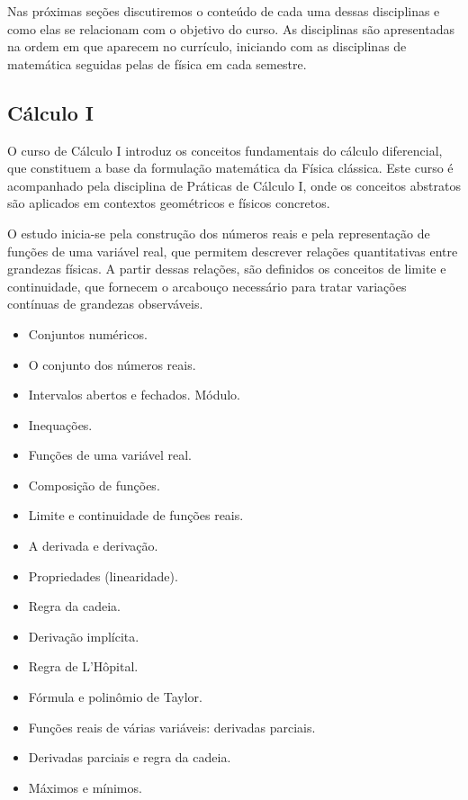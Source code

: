 \documentclass[a4paper, 12pt]{article}
\newcounter{mat}
\begin{document}
Nas próximas seções discutiremos o conteúdo de cada uma dessas disciplinas e como elas
se relacionam com o objetivo do curso. As disciplinas são apresentadas na ordem em que
aparecem no currículo, iniciando com as disciplinas de matemática seguidas pelas de
física em cada semestre.

\pagebreak

\subsection{Cálculo I}
\label{mat001}

O curso de Cálculo I introduz os conceitos fundamentais do cálculo diferencial, que
constituem a base da formulação matemática da Física clássica. Este curso é acompanhado
pela disciplina de Práticas de Cálculo I, onde os conceitos abstratos são aplicados em
contextos geométricos e físicos concretos.

O estudo inicia-se pela construção dos números reais e pela representação de funções de
uma variável real, que permitem descrever relações quantitativas entre grandezas
físicas. A partir dessas relações, são definidos os conceitos de limite e continuidade,
que fornecem o arcabouço necessário para tratar variações contínuas de grandezas
observáveis.

\begin{tcolorbox}[title=Ementa:]
    \begin{itemize}
        \item Conjuntos numéricos.
        \item O conjunto dos números reais.
        \item Intervalos abertos e fechados. Módulo.
        \item Inequações.
        \item Funções de uma variável real.
        \item Composição de funções.
        \item Limite e continuidade de funções reais.
        \item A derivada e derivação.
        \item Propriedades (linearidade).
        \item Regra da cadeia.
        \item Derivação implícita.
        \item Regra de L'Hôpital.
        \item Fórmula e polinômio de Taylor.
        \item Funções reais de várias variáveis: derivadas parciais.
        \item Derivadas parciais e regra da cadeia.
        \item Máximos e mínimos.
    \end{itemize}
\end{tcolorbox}
\end{document}

